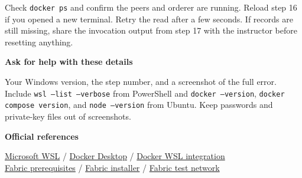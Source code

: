 \documentclass[11pt,a4paper]{article}
\begin{document}
\vspace{1mm}{\bfseries Transaction times out, or the asset cannot be found}\par
Check \texttt{docker ps} and confirm the peers and orderer are running. Reload step 16 if you opened a new terminal. Retry the read after a few seconds. If records are still missing, share the invocation output from step 17 with the instructor before resetting anything.

\vspace{3mm}
\begin{tcolorbox}[colback=Soft,colframe=Soft,boxrule=0pt,arc=1mm,left=3mm,right=3mm,top=2mm,bottom=2mm]
\textbf{Ask for help with these details}\par
Your Windows version, the step number, and a screenshot of the full error. Include \texttt{wsl --list --verbose} from PowerShell and \texttt{docker --version}, \texttt{docker compose version}, and \texttt{node --version} from Ubuntu. Keep passwords and private-key files out of screenshots.
\end{tcolorbox}

\vfill
{\small\bfseries Official references}\par
{\small
\href{https://learn.microsoft.com/en-us/windows/wsl/install}{Microsoft WSL} \enspace / \enspace
\href{https://docs.docker.com/desktop/setup/install/windows-install/}{Docker Desktop} \enspace / \enspace
\href{https://docs.docker.com/desktop/features/wsl/}{Docker WSL integration}\\[3pt]
\href{https://hyperledger-fabric.readthedocs.io/en/release-2.5/prereqs.html}{Fabric prerequisites} \enspace / \enspace
\href{https://hyperledger-fabric.readthedocs.io/en/release-2.5/install.html}{Fabric installer} \enspace / \enspace
\href{https://hyperledger-fabric.readthedocs.io/en/release-2.5/test_network.html}{Fabric test network}}
\end{document}
